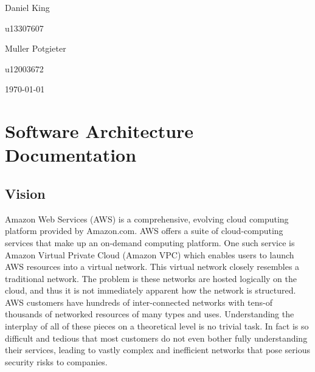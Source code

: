 \documentclass[hidelinks,a4paper,12pt]{article}
\begin{document}
\begin{titlepage}
\begin{center}
\begin{minipage}{0.4\textwidth}
\begin{flushleft} \large
Daniel {King}
\end{flushleft}
\end{minipage}
\begin{minipage}{0.4\textwidth}
\begin{flushright} \large
\emph{}
u13307607
\end{flushright}
\end{minipage}

\begin{minipage}{0.4\textwidth}
\begin{flushleft} \large
Muller {Potgieter}
\end{flushleft}
\end{minipage}
\begin{minipage}{0.4\textwidth}
\begin{flushright} \large
\emph{}
u12003672
\end{flushright}
\end{minipage}

\vfill
{\large \today}
\end{center}
\end{titlepage}
\footnotesize
%
\normalsize


\tableofcontents
\newpage
{}


\section{Software Architecture Documentation}
\subsection{Vision} 
Amazon Web Services (AWS) is a comprehensive, evolving cloud computing platform provided by Amazon.com. 
AWS offers a suite of cloud-computing services that make up an on-demand computing platform. One such service is Amazon Virtual Private Cloud (Amazon VPC) which enables users to launch AWS resources into a virtual network. This virtual network closely resembles a traditional network. The problem is these networks are hosted logically on the cloud, and thus it is not immediately apparent how the network is structured. AWS customers have hundreds of inter-connected networks with tens-of thousands of networked resources of many types and uses. Understanding the interplay of all of these pieces on a theoretical level is no trivial task. In fact is so difficult and tedious that most customers do not even bother fully understanding their services, leading to vastly complex and inefficient networks that pose serious security risks to companies.
\end{document}
